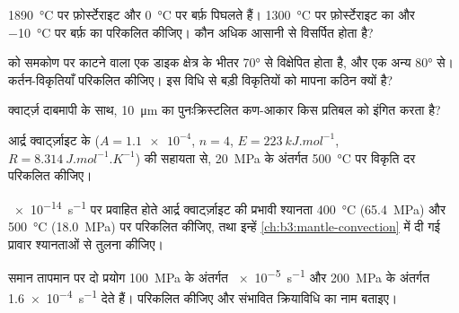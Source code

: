 \begin{exercise}[$\star$]\label{exo:b3:deformation-mechanisms:1}
\qty{1890}{\celsius} पर फ़ोर्स्टेराइट और \qty{0}{\celsius} पर बर्फ़ पिघलते हैं।
\qty{1300}{\celsius} पर फ़ोर्स्टेराइट का और \qty{-10}{\celsius} पर बर्फ़ का  परिकलित कीजिए।
कौन अधिक आसानी से विसर्पित होता है?
\end{exercise}

\begin{exercise}[$\star$]\label{exo:b3:deformation-mechanisms:2}
 को समकोण पर काटने वाला एक डाइक क्षेत्र के भीतर \ang{70} से विक्षेपित होता है, और एक अन्य
\ang{80} से। कर्तन-विकृतियाँ परिकलित कीजिए। इस विधि से बड़ी
विकृतियों को मापना कठिन क्यों है?
\end{exercise}

\begin{exercise}[$\star$]\label{exo:b3:deformation-mechanisms:3}
क्वार्ट्ज़ दाबमापी के साथ, \qty{10}{\micro m} का
पुनःक्रिस्टलित कण-आकार किस प्रतिबल को इंगित करता है?
\end{exercise}

\begin{exercise}[$\star$]\label{exo:b3:deformation-mechanisms:4}
आर्द्र क्वार्ट्ज़ाइट के  ($A = \num{1.1e-4}$, $n = 4$, $E =
\qty{223}{kJ.mol^{-1}}$, $R = \qty{8.314}{J.mol^{-1}.K^{-1}}$) की सहायता से,
\qty{20}{MPa} के अंतर्गत \qty{500}{\celsius} पर विकृति दर परिकलित कीजिए।
\end{exercise}

\begin{exercise}[$\star\star$]\label{exo:b3:deformation-mechanisms:5}
\qty{e-14}{s^{-1}} पर प्रवाहित होते आर्द्र क्वार्ट्ज़ाइट की प्रभावी श्यानता
\qty{400}{\celsius} (\qty{65.4}{MPa}) और
\qty{500}{\celsius} (\qty{18.0}{MPa}) पर परिकलित कीजिए, तथा इन्हें
\cref{ch:b3:mantle-convection} में दी गई प्रावार श्यानताओं से तुलना कीजिए।
\end{exercise}

\begin{exercise}[$\star\star$]\label{exo:b3:deformation-mechanisms:6}
समान तापमान पर दो प्रयोग \qty{100}{MPa} के अंतर्गत \qty{e-5}{s^{-1}} और
\qty{200}{MPa} के अंतर्गत \qty{1.6e-4}{s^{-1}} देते हैं।  परिकलित कीजिए और
संभावित क्रियाविधि का नाम बताइए।
\end{exercise}

